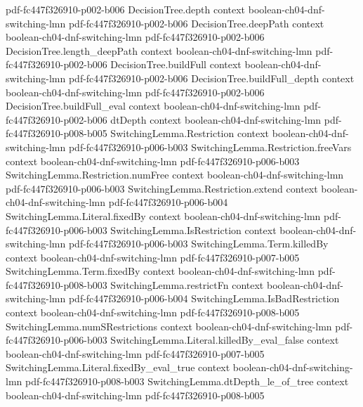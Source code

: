\begin{lemma}
  {pdf-fc447f326910-p002-b006}
\proofstep
  {DecisionTree.depth}
  {context}
  {boolean-ch04-dnf-switching-lmn}
  {pdf-fc447f326910-p002-b006}
\proofstep
  {DecisionTree.deepPath}
  {context}
  {boolean-ch04-dnf-switching-lmn}
  {pdf-fc447f326910-p002-b006}
\proofstep
  {DecisionTree.length_deepPath}
  {context}
  {boolean-ch04-dnf-switching-lmn}
  {pdf-fc447f326910-p002-b006}
\proofstep
  {DecisionTree.buildFull}
  {context}
  {boolean-ch04-dnf-switching-lmn}
  {pdf-fc447f326910-p002-b006}
\proofstep
  {DecisionTree.buildFull_depth}
  {context}
  {boolean-ch04-dnf-switching-lmn}
  {pdf-fc447f326910-p002-b006}
\proofstep
  {DecisionTree.buildFull_eval}
  {context}
  {boolean-ch04-dnf-switching-lmn}
  {pdf-fc447f326910-p002-b006}
\proofstep
  {dtDepth}
  {context}
  {boolean-ch04-dnf-switching-lmn}
  {pdf-fc447f326910-p008-b005}
\proofstep
  {SwitchingLemma.Restriction}
  {context}
  {boolean-ch04-dnf-switching-lmn}
  {pdf-fc447f326910-p006-b003}
\proofstep
  {SwitchingLemma.Restriction.freeVars}
  {context}
  {boolean-ch04-dnf-switching-lmn}
  {pdf-fc447f326910-p006-b003}
\proofstep
  {SwitchingLemma.Restriction.numFree}
  {context}
  {boolean-ch04-dnf-switching-lmn}
  {pdf-fc447f326910-p006-b003}
\proofstep
  {SwitchingLemma.Restriction.extend}
  {context}
  {boolean-ch04-dnf-switching-lmn}
  {pdf-fc447f326910-p006-b004}
\proofstep
  {SwitchingLemma.Literal.fixedBy}
  {context}
  {boolean-ch04-dnf-switching-lmn}
  {pdf-fc447f326910-p006-b003}
\proofstep
  {SwitchingLemma.IsRestriction}
  {context}
  {boolean-ch04-dnf-switching-lmn}
  {pdf-fc447f326910-p006-b003}
\proofstep
  {SwitchingLemma.Term.killedBy}
  {context}
  {boolean-ch04-dnf-switching-lmn}
  {pdf-fc447f326910-p007-b005}
\proofstep
  {SwitchingLemma.Term.fixedBy}
  {context}
  {boolean-ch04-dnf-switching-lmn}
  {pdf-fc447f326910-p008-b003}
\proofstep
  {SwitchingLemma.restrictFn}
  {context}
  {boolean-ch04-dnf-switching-lmn}
  {pdf-fc447f326910-p006-b004}
\proofstep
  {SwitchingLemma.IsBadRestriction}
  {context}
  {boolean-ch04-dnf-switching-lmn}
  {pdf-fc447f326910-p008-b005}
\proofstep
  {SwitchingLemma.numSRestrictions}
  {context}
  {boolean-ch04-dnf-switching-lmn}
  {pdf-fc447f326910-p006-b003}
\proofstep
  {SwitchingLemma.Literal.killedBy_eval_false}
  {context}
  {boolean-ch04-dnf-switching-lmn}
  {pdf-fc447f326910-p007-b005}
\proofstep
  {SwitchingLemma.Literal.fixedBy_eval_true}
  {context}
  {boolean-ch04-dnf-switching-lmn}
  {pdf-fc447f326910-p008-b003}
\proofstep
  {SwitchingLemma.dtDepth_le_of_tree}
  {context}
  {boolean-ch04-dnf-switching-lmn}
  {pdf-fc447f326910-p008-b005}
\proofstep

\end{lemma}

